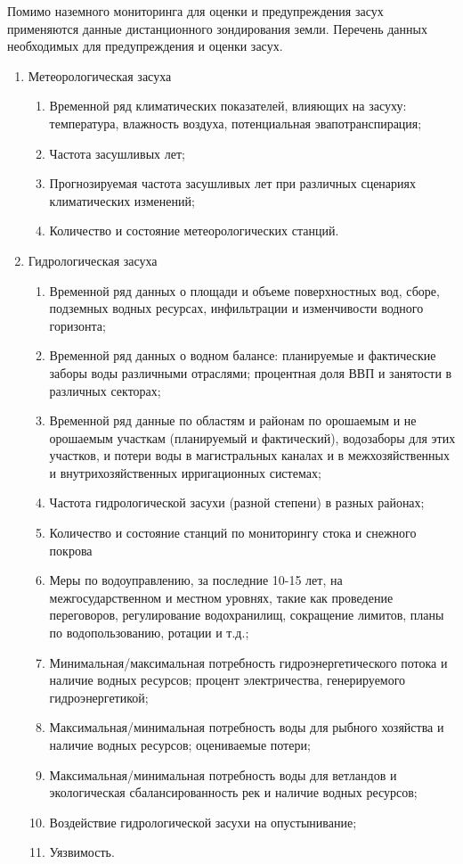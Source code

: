 Помимо наземного мониторинга для оценки и предупреждения засух применяются данные дистанционного зондирования земли.
Перечень данных необходимых для предупреждения и оценки засух.

\begin{enumerate}
	\item Метеорологическая засуха 

	\begin{enumerate}
		\item Временной ряд климатических показателей, влияющих на засуху: температура, влажность воздуха, потенциальная эвапотранспирация;
		\item Частота засушливых лет;
		\item Прогнозируемая частота засушливых лет при различных сценариях климатических изменений;
		\item Количество и состояние метеорологических станций.
	\end{enumerate}

	\item Гидрологическая засуха

	\begin{enumerate}
		\item Временной ряд данных о площади и объеме поверхностных вод, сборе, подземных водных ресурсах, инфильтрации и изменчивости водного горизонта;
		\item Временной ряд данных о водном балансе: планируемые и фактические заборы воды различными отраслями; процентная доля ВВП и занятости в различных секторах;
		\item Временной ряд данные по областям и районам по орошаемым и не орошаемым участкам (планируемый и фактический), водозаборы для этих участков, и потери воды в магистральных каналах и в межхозяйственных и внутрихозяйственных ирригационных системах;
		\item Частота гидрологической засухи (разной степени) в разных районах;
		\item Количество и состояние станций по мониторингу стока и снежного покрова
		\item Меры по водоуправлению, за последние 10-15 лет, на межгосударственном и местном уровнях, такие как проведение переговоров, регулирование водохранилищ, сокращение лимитов, планы по водопользованию, ротации и т.д.;
		\item Минимальная/максимальная потребность гидроэнергетического потока и наличие водных ресурсов; процент электричества, генерируемого гидроэнергетикой;
		\item Максимальная/минимальная потребность воды для рыбного хозяйства и наличие водных ресурсов; оцениваемые потери;
		\item Максимальная/минимальная потребность воды для ветландов и экологическая сбалансированность рек и наличие водных ресурсов;
		\item Воздействие гидрологической засухи на опустынивание;
		\item Уязвимость.
	\end{enumerate}


\end{enumerate}
